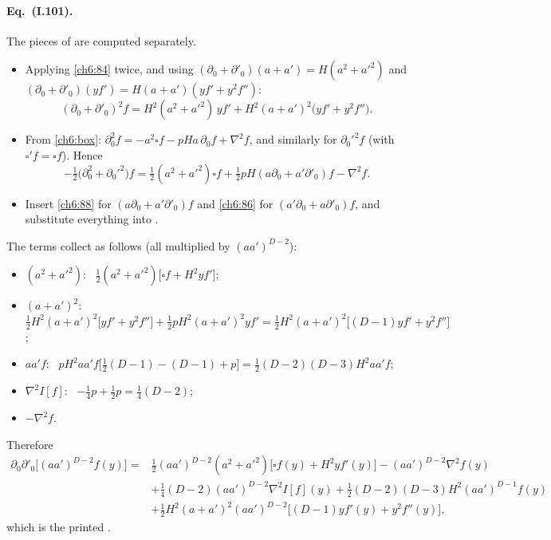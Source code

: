 \paragraph{Eq.~(I.101).} The pieces of  are computed separately.
\begin{itemize}[leftmargin=14pt]
\item Applying \eqref{ch6:84} twice, and using $(\partial_0+\partial'_0)(a+a')=H(a^2+a'^2)$ and $(\partial_0+\partial'_0)(yf')=H(a+a')(yf'+y^2f'')$:
\begin{equation}
(\partial_0+\partial'_0)^2f=H^2(a^2+a'^2)\,yf'+H^2(a+a')^2\big(yf'+y^2f''\big).
\end{equation}
\item From \eqref{ch6:box}: $\partial_0^2f=-a^2\square f-pHa\,\partial_0f+\nabla^2f$, and similarly for $\partial_0'^2f$ (with $\square'f=\square f$). Hence
\begin{equation}
-\tfrac12\big(\partial_0^2+\partial_0'^2\big)f=\tfrac12(a^2+a'^2)\square f+\tfrac12pH(a\partial_0+a'\partial'_0)f-\nabla^2f .
\end{equation}
\item Insert \eqref{ch6:88} for $(a\partial_0+a'\partial'_0)f$ and \eqref{ch6:86} for $(a'\partial_0+a\partial'_0)f$, and substitute everything into .
\end{itemize}
The terms collect as follows (all multiplied by $(aa')^{D-2}$):
\begin{itemize}[leftmargin=14pt]
\item $(a^2+a'^2)$: \ $\frac12(a^2+a'^2)\big[\square f+H^2yf'\big]$;
\item $(a+a')^2$: \ $\frac12H^2(a+a')^2\big[yf'+y^2f''\big]+\frac12pH^2(a+a')^2yf'=\frac12H^2(a+a')^2\big[(D-1)yf'+y^2f''\big]$;
\item $aa'f$: \ $pH^2aa'f\big[\frac12(D-1)-(D-1)+p\big]=\frac12(D-2)(D-3)H^2aa'f$;
\item $\nabla^2I[f]$: \ $-\frac14p+\frac12p=\frac14(D-2)$;
\item $-\nabla^2f$.
\end{itemize}
Therefore
\begin{equation}
\begin{split}
\partial_0\partial'_0\big[(aa')^{D-2}f(y)\big]={}&\tfrac12(aa')^{D-2}(a^2+a'^2)\big[\square f(y)+H^2yf'(y)\big]-(aa')^{D-2}\nabla^2f(y)\\
&+\tfrac14(D-2)(aa')^{D-2}\nabla^2I[f](y)+\tfrac12(D-2)(D-3)H^2(aa')^{D-1}f(y)\\
&+\tfrac12H^2(a+a')^2(aa')^{D-2}\big[(D-1)yf'(y)+y^2f''(y)\big],
\end{split}\tag{I.101}
\end{equation}
which is the printed .

